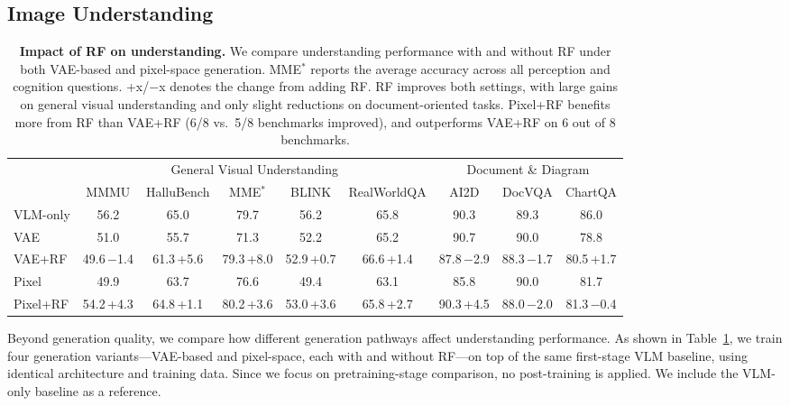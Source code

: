 \documentclass{llmxive}
\begin{document}
\subsection{Image Understanding}
\label{sec:understanding}
\begin{table}[t]
\centering
\footnotesize
\setlength{\tabcolsep}{5pt}
\begin{tabular}{l|ccccc|ccc}
\toprule
& \multicolumn{5}{c|}{General Visual Understanding} & \multicolumn{3}{c}{Document \& Diagram} \\
\cmidrule(lr){2-6} \cmidrule(lr){7-9}
& MMMU & HalluBench & MME$^*$ & BLINK & RealWorldQA & AI2D & DocVQA & ChartQA \\
\midrule
VLM-only & 56.2 & 65.0 & 79.7 & 56.2 & 65.8 & 90.3 & 89.3 & 86.0 \\
\midrule
VAE    & 51.0 & 55.7 & 71.3 & 52.2 & 65.2 & 90.7 & 90.0 & 78.8 \\
VAE+RF & 49.6{\tiny\,$-$1.4} & 61.3{\tiny\,+5.6} & 79.3{\tiny\,+8.0} & 52.9{\tiny\,+0.7} & 66.6{\tiny\,+1.4} & 87.8{\tiny\,$-$2.9} & 88.3{\tiny\,$-$1.7} & 80.5{\tiny\,+1.7} \\
\midrule
Pixel    & 49.9 & 63.7 & 76.6 & 49.4 & 63.1 & 85.8 & 90.0 & 81.7 \\
Pixel+RF & 54.2{\tiny\,+4.3} & 64.8{\tiny\,+1.1} & 80.2{\tiny\,+3.6} & 53.0{\tiny\,+3.6} & 65.8{\tiny\,+2.7} & 90.3{\tiny\,+4.5} & 88.0{\tiny\,$-$2.0} & 81.3{\tiny\,$-$0.4} \\
\bottomrule
\end{tabular}
\caption{\textbf{Impact of RF on understanding.} We compare understanding performance with and without RF under both VAE-based and pixel-space generation. MME$^*$ reports the average accuracy across all perception and cognition questions. {\tiny+x}/{\tiny$-$x} denotes the change from adding RF. RF improves both settings, with large gains on general visual understanding and only slight reductions on document-oriented tasks. Pixel+RF benefits more from RF than VAE+RF (6/8 vs.\ 5/8 benchmarks improved), and outperforms VAE+RF on 6 out of 8 benchmarks.}
\label{tab:understanding}
\end{table}


Beyond generation quality, we compare how different generation pathways affect understanding performance. As shown in Table~\ref{tab:understanding}, we train four generation variants---VAE-based and pixel-space, each with and without RF---on top of the same first-stage VLM baseline, using identical architecture and training data. Since we focus on pretraining-stage comparison, no post-training is applied. We include the VLM-only baseline as a reference.
\end{document}
